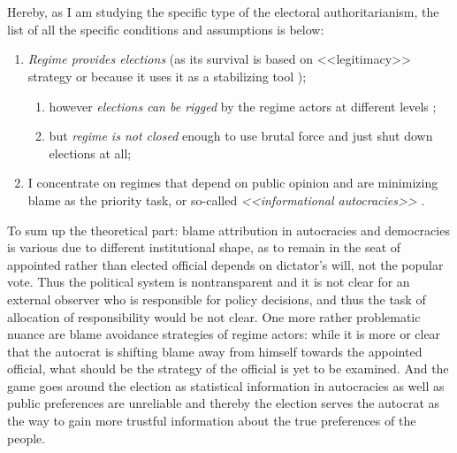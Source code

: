 \documentclass[a4paper, 12pt]{article}
\begin{document}
    \\\\
		\noindent Hereby, as I am studying the specific type of the electoral authoritarianism, the list of all the specific conditions and assumptions is below:
	\begin{enumerate}
	    \item \textit{Regime provides elections} (as its survival is based on <<legitimacy>> strategy or because it uses it as a stabilizing tool \parencite{stab1});
	    
	    \begin{enumerate}
	        \item however \textit{elections can be rigged} by the regime actors at different levels \parencite{manipulation};
	        
	        \item but \textit{regime is not closed} enough to use brutal force and just shut down elections at all;
	        
	    \end{enumerate}
	    
	    \item I concentrate on regimes that depend on public opinion and are minimizing blame as the priority task, or so-called \textit{<<informational autocracies>>} \parencite{inform}.
	    
	\end{enumerate}
	\noindent To sum up the theoretical part: blame attribution in autocracies and democracies is various due to different institutional shape, as to remain in the seat of appointed rather than elected official depends on dictator's will, not the popular vote. Thus the political system is nontransparent and it is not clear for an external observer who is responsible for policy decisions, and thus the task of allocation of responsibility would be not clear. One more rather problematic nuance are blame avoidance strategies of regime actors: while it is more or clear that the autocrat is shifting blame away from himself towards the appointed official, what should be the strategy of the official is yet to be examined. And the game goes around the election as statistical information in autocracies as well as public preferences are unreliable and thereby the election serves the autocrat as the way to gain more trustful information about the true preferences of the people.
\end{document}
